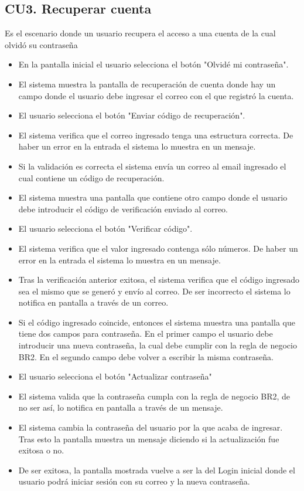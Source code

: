 \newpage
\subsection{CU3. Recuperar cuenta}  \par
Es el escenario donde un usuario recupera el acceso a una cuenta de la cual olvidó su contraseña
\begin{itemize}
	\item En la pantalla inicial el usuario selecciona el botón "Olvidé mi contraseña".
	\item El sistema muestra la pantalla de recuperación de cuenta donde hay un campo donde el usuario debe ingresar el correo con el que registró la cuenta.
	\item El usuario selecciona el botón "Enviar código de recuperación".
	\item El sistema verifica que el correo ingresado tenga una estructura correcta. De haber un error en la entrada el sistema lo muestra en un mensaje.
	\item Si la validación es correcta el sistema envía un correo al email ingresado el cual contiene un código de recuperación.
	\item El sistema muestra una pantalla que contiene otro campo donde el usuario debe introducir el código de verificación enviado al correo.
	\item El usuario selecciona el botón "Verificar código".
	\item El sistema verifica que el valor ingresado contenga sólo números. De haber un error en la entrada el sistema lo muestra en un mensaje.
	\item Tras la verificación anterior exitosa, el sistema verifica que el código ingresado sea el mismo que se generó y envío al correo. De ser incorrecto el sistema lo notifica en pantalla a través de un correo.
	\item Si el código ingresado coincide, entonces el sistema muestra una pantalla que tiene dos campos para contraseña. En el primer campo el usuario debe introducir una nueva contraseña, la cual debe cumplir con la regla de negocio BR2. En el segundo campo debe volver a escribir la misma contraseña.
	\item El usuario selecciona el botón "Actualizar contraseña"
	\item El sistema valida que la contraseña cumpla con la regla de negocio BR2, de no ser así, lo notifica en pantalla a través de un mensaje.
	\item El sistema cambia la contraseña del usuario por la que acaba de ingresar. Tras esto la pantalla muestra un mensaje diciendo si la actualización fue exitosa o no.
	\item De ser exitosa, la pantalla mostrada vuelve a ser la del Login inicial donde el usuario podrá iniciar sesión con su correo y la nueva contraseña.
\end{itemize}

